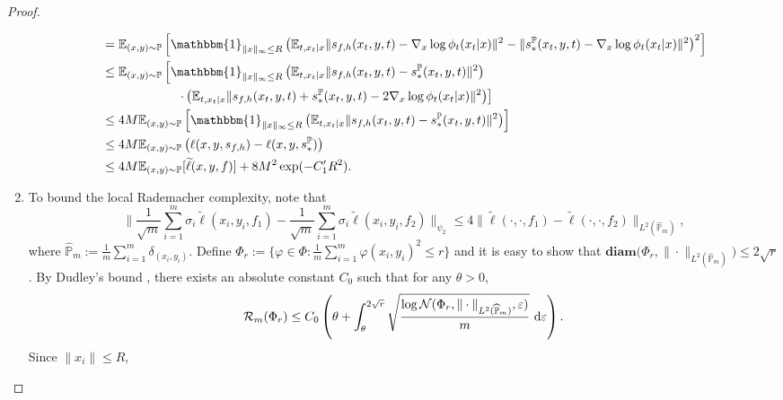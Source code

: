 \documentclass[11pt]{article}
\numberwithin{equation}{section}
\renewcommand{\P}{\mathbb{P}}
\begin{document}
\begin{proof}
\begin{enumerate}[label=\textbf{Step \arabic*.}]
\begin{equation}
\begin{aligned}
                    &= \E_{(x,y)\sim\P}\left[\mathbbm{1}_{\|x\|_\infty\leq R} \left(\E_{t,x_t|x}\|s_{f,h}(x_t,y,t)-\nabla_x\log\phi_t(x_t|x)\|^2-\|s_*^\P(x_t,y,t)-\nabla_x\log\phi_t(x_t|x)\|^2\right)^2\right] \\
                    &\leq \E_{(x,y)\sim\P} \left[\mathbbm{1}_{\|x\|_\infty\leq R}\left(\E_{t,x_t|x}\|s_{f,h}(x_t,y,t)-s_*^\P(x_t,y,t)\|^2\right)\right.\\
                    &\qquad\qquad\qquad \left.\cdot \left(\E_{t,x_t|x}\|s_{f,h}(x_t,y,t)+s_*^\P(x_t,y,t)-2\nabla_x\log\phi_t(x_t|x)\|^2\right)\right] \\
                    &\leq 4M\E_{(x,y)\sim\P} \left[\mathbbm{1}_{\|x\|_\infty\leq R}\left(\E_{t,x_t|x}\|s_{f,h}(x_t,y,t)-s_*^\P(x_t,y,t)\|^2\right)\right] \\
                    &\leq 4M \E_{(x,y)\sim\P}\left(\ell(x,y,s_{f,h})-\ell(x,y,s_*^\P)\right) \\
                    &\leq 4M\E_{(x,y)\sim\P} [\widetilde{\ell}(x,y,f)] + 8M^2\exp(-C_1'R^2).
                \end{aligned}
            \end{equation}
        \item To bound the local Rademacher complexity, note that
            \begin{equation}
                \Big\|\frac{1}{\sqrt{m}} \sum_{i=1}^m\sigma_i\widetilde{\ell}(x_i,y_i,f_1) - \frac{1}{\sqrt{m}}\sum_{i=1}^m\sigma_i\widetilde{\ell}(x_i,y_i,f_2) \Big\|_{\psi_2} \leq 4\|\widetilde{\ell}(\cdot,\cdot,f_1)-\widetilde{\ell}(\cdot,\cdot,f_2)\|_{L^2(\widehat{\P}_m)},
            \end{equation}
            where $\widehat{\P}_m:=\frac{1}{m}\sum_{i=1}^m\delta_{(x_i,y_i)}$.
            Define $\Phi_r:=\{\varphi\in\Phi:\frac{1}{m}\sum_{i=1}^m\varphi(x_i,y_i)^2\leq r\}$
            and it is easy to show that $\textbf{diam}\big(\Phi_r,\|\cdot\|_{L^2(\widehat{\P}_m)}\big)\leq 2\sqrt{r}$.
            By Dudley's bound \citep{van2014probability,wainwright2019high}, there exists an absolute constant $C_0$ such that for any $\theta>0$,
            \begin{equation}\label{eq:rademacher_bound_2}
                \mathcal{R}_m(\Phi_r)\leq C_0\left(\theta+\int_\theta^{2\sqrt{r}}\sqrt{\frac{\log\mathcal{N}(\Phi_r,\|\cdot\|_{L^2(\widehat{\P}_m)},\varepsilon)}{m}}\ \dif\varepsilon\right).
            \end{equation}
            Since $\|x_i\|\leq R$,
            \begin{equation}

\end{equation}
\end{enumerate}
\end{proof}
\end{document}
